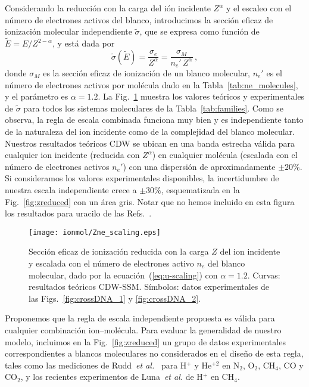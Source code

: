 Considerando la reducción con la carga del ión incidente $Z^\alpha$ y el 
escaleo con el número de electrones activos del blanco, introducimos 
la sección eficaz de ionización molecular independiente $\tilde{\sigma}$, 
que se expresa como función de $\tilde{E}=E/Z^{2-\alpha}$, y está dada por
\begin{equation}
 \tilde{\sigma}\left(\tilde{E}\right)=\frac{\sigma_e}{Z^{\alpha}}
 =\frac{\sigma_M}{n_e'\,Z^{\alpha}}\,,
\label{eq:u-scaling}
\end{equation}
donde $\sigma_M$ es la sección eficaz de ionización de un blanco 
molecular, $n_e'$ es el número de electrones activos por molécula dado
en la Tabla~\ref{tab:ne_molecules}, y el parámetro es $\alpha=1.2$. La 
Fig.~\ref{fig:zalpha} muestra los valores teóricos y experimentales de 
$\tilde{\sigma}$ para todos los sistemas moleculares de la 
Tabla~\ref{tab:families}. Como se observa, la regla de escala combinada 
funciona muy bien y es independiente tanto de la naturaleza del ion 
incidente como de la complejidad del blanco molecular. Nuestros 
resultados teóricos CDW se ubican en una banda estrecha válida para 
cualquier ion incidente (reducida con $Z^\alpha$) en cualquier molécula
(escalada con el número de electrones activos $n_e'$) con una dispersión 
de aproximadamente $\pm 20\%$. Si consideramos los valores experimentales
disponibles, la incertidumbre de nuestra escala independiente crece a 
$\pm 30\%$, esquematizada en la Fig.~\ref{fig:zreduced} con un área gris. 
Notar que no hemos incluido en esta figura los resultados para uracilo de 
las Refs.~\cite{agnihotri2012,agnihotri2013}. 

\begin{figure}[t]
\centering
\texttt{[image: ionmol/Zne\_scaling.eps]}
\caption[Sección eficaz de ionización reducida por $Z$ y $n_e$.]
{Sección eficaz de ionización reducida con la carga $Z$ del ion incidente
y escalada con el número de electrones activo $n_e$ del blanco molecular,
dado por la ecuación~(\ref{eq:u-scaling}) con $\alpha=1.2$. 
Curvas: resultados teóricos CDW-SSM. Símbolos: datos experimentales de 
las Figs.~\ref{fig:crossDNA_1} y \ref{fig:crossDNA_2}.}
\label{fig:zalpha}
\end{figure} 

Proponemos que la regla de escala independiente propuesta es válida para 
cualquier combinación ion--molécula. Para evaluar la generalidad de 
nuestro modelo, incluimos en la Fig.~\ref{fig:zreduced} un grupo de datos 
experimentales correspondientes a blancos moleculares no considerados en 
el diseño de esta regla, tales como las mediciones de 
Rudd~\textit{et al.}~\cite{Rudd:85,Rudd:83} para H$^{+}$ y He$^{+2}$ 
en N$_2$, O$_2$, CH$_4$, CO y CO$_2$, y los recientes experimentos de
Luna~\textit{et al.} \cite{Luna2019} de H$^{+}$ en CH$_4$. 

